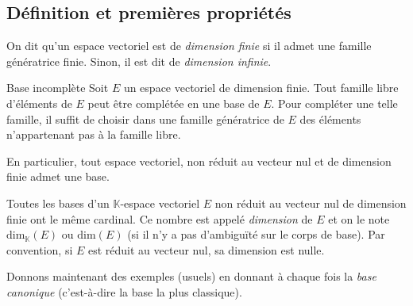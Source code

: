 \documentclass[french,11pt,twoside]{VcCours}
\begin{document}
 \subsection{Définition et premières propriétés}
 \begin{Definition}{} On dit qu'un espace vectoriel est de \emph{dimension finie} si il admet une famille génératrice finie. Sinon, il est dit de \emph{dimension infinie}.
 \end{Definition}
 
 
 \begin{Theoreme}{Base incomplète}\label{BaseInc}
 Soit $E$ un espace vectoriel de dimension finie. Tout famille libre d'éléments de $E$ peut être complétée en une base de $E$. Pour compléter une telle famille, il suffit de choisir dans une famille génératrice de $E$ des éléments n'appartenant pas à la famille libre.
 
 \medskip
 
En particulier, tout espace vectoriel, non réduit au vecteur nul et de dimension finie admet une base.
 \end{Theoreme}
% 
% 

 \begin{Theoreme}{} Toutes les bases d'un $\mathbb{K}$-espace vectoriel $E$ non réduit au vecteur nul de dimension finie ont le même cardinal. Ce nombre est appelé \emph{dimension} de $E$ et on le note $\textrm{dim}_{\mathbb{K}}(E)$ ou $\textrm{dim}(E)$ (si il n'y a pas d'ambiguïté sur le corps de base). Par convention, si $E$ est réduit au vecteur nul, sa dimension est nulle.
 \end{Theoreme}
 

 
 Donnons maintenant des exemples (usuels) en donnant à chaque fois la \emph{base canonique} (c'est-à-dire la base la plus classique).
 
 \medskip
 
\end{document}
